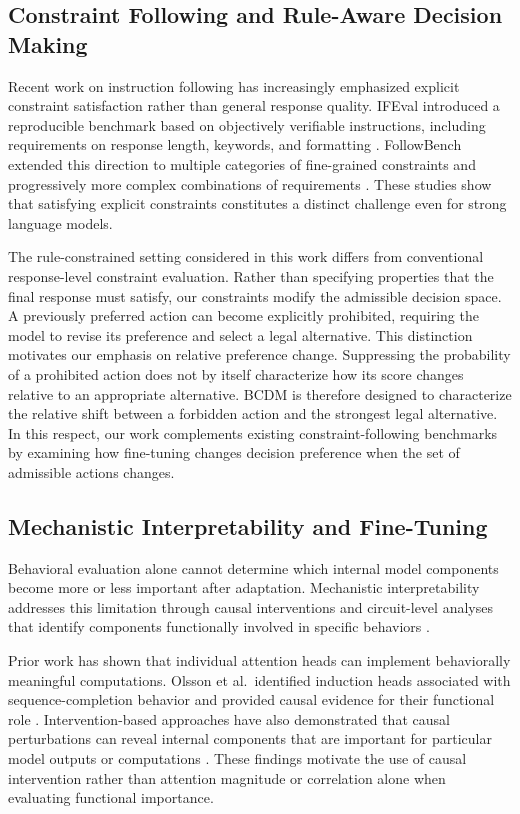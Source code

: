 \subsection{Constraint Following and Rule-Aware Decision Making}
\label{sec:rw_constraints}

Recent work on instruction following has increasingly emphasized explicit constraint satisfaction rather than general response quality. IFEval introduced a reproducible benchmark based on objectively verifiable instructions, including requirements on response length, keywords, and formatting \cite{zhou2023ifeval}. FollowBench extended this direction to multiple categories of fine-grained constraints and progressively more complex combinations of requirements \cite{jiang2024followbench}. These studies show that satisfying explicit constraints constitutes a distinct challenge even for strong language models.

The rule-constrained setting considered in this work differs from conventional response-level constraint evaluation. Rather than specifying properties that the final response must satisfy, our constraints modify the admissible decision space. A previously preferred action can become explicitly prohibited, requiring the model to revise its preference and select a legal alternative. This distinction motivates our emphasis on relative preference change. Suppressing the probability of a prohibited action does not by itself characterize how its score changes relative to an appropriate alternative. BCDM is therefore designed to characterize the relative shift between a forbidden action and the strongest legal alternative. In this respect, our work complements existing constraint-following benchmarks by examining how fine-tuning changes decision preference when the set of admissible actions changes.

\subsection{Mechanistic Interpretability and Fine-Tuning}
\label{sec:rw_mechanistic}

Behavioral evaluation alone cannot determine which internal model components become more or less important after adaptation. Mechanistic interpretability addresses this limitation through causal interventions and circuit-level analyses that identify components functionally involved in specific behaviors \cite{elhage2021mathematical,meng2022locating,conmy2023automated}.

Prior work has shown that individual attention heads can implement behaviorally meaningful computations. Olsson et al.\ identified induction heads associated with sequence-completion behavior and provided causal evidence for their functional role \cite{olsson2022induction}. Intervention-based approaches have also demonstrated that causal perturbations can reveal internal components that are important for particular model outputs or computations \cite{meng2022locating,conmy2023automated}. These findings motivate the use of causal intervention rather than attention magnitude or correlation alone when evaluating functional importance.


